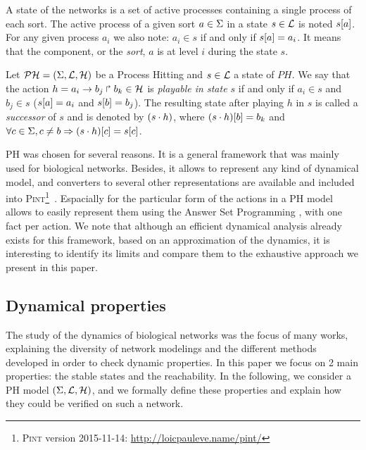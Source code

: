 A state of the networks is a set of active processes containing a single process of each sort.
The active process of a given sort $a \in \Sigma$ in a state $s \in \mathcal{L}$
is noted ${s[a]}$.
For any given process $a_i$ we also note: $a_i \in s$ if and only if ${s[a]} = a_i$. It means that the component, or the \emph{sort}, $a$ is at level $i$ during the state $s$.

\begin{definition} 
\label{def:playableAction}
Let $\mathcal{PH} = (\Sigma,\mathcal{L},\mathcal{H})$ be a Process Hitting and $s \in \mathcal{L}$ a state of $PH$.
We say that the action $h = a_i\rightarrow b_j\Rsh b_k \in \mathcal{H}$
is \emph{playable in state $s$} if and only if
$a_i \in s$ and $b_j \in s$ (\ie ${s[a]} = a_i$ and ${s[b]}=b_j$).
The resulting state after playing $h$ in $s$
is called a \emph{successor} of $s$ and
is denoted by $(s \cdot h)$,
where ${(s \cdot h)[b]} = b_k$ and
$\forall c \in \Sigma, c \neq b \Rightarrow {(s \cdot h)[c]}={s[c]}$.
\end{definition}

PH was chosen for several reasons. It is a general framework that was mainly used for biological networks. Besides, it allows to represent any kind of dynamical model,
and converters to several other representations are available and included into \textsc{Pint}\footnote{\textsc{Pint} version 2015-11-14: \url{http://loicpauleve.name/pint/}}~\cite{PMR12-MSCS}. Espacially for the particular form of the actions in a PH model allows
to easily represent them using the Answer Set Programming \cite{Baral03, Vladimir, Glimpse, sureshkumar2006ansprolog},
with one fact per action. We note that although an efficient dynamical analysis already exists for this framework,
based on an approximation of the dynamics,
it is interesting to identify its limits
and compare them to the exhaustive approach we present in this paper.

\subsection{Dynamical properties}

The study of the dynamics of biological networks was the focus of many works, explaining the diversity of network modelings and the different methods developed in order to check dynamic properties.
In this paper we focus on 2 main properties: the stable states and the reachability.
In the following, we consider a PH model $(\Sigma,\mathcal{L},\mathcal{H})$,
and we formally define these properties
and explain how they could be verified on such a network.

